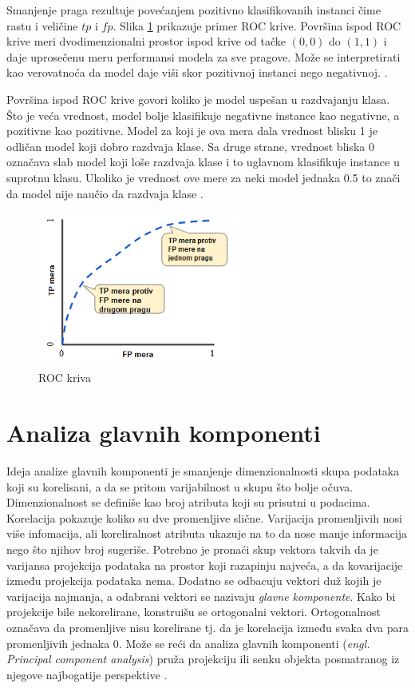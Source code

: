 Smanjenje praga rezultuje povećanjem pozitivno klasifikovanih instanci čime rastu i veličine $tp$ i $fp$. Slika \ref{fig:roc} prikazuje primer ROC krive. Površina ispod ROC krive meri dvodimenzionalni prostor ispod krive od tačke $(0, 0)$ do $(1, 1)$ i daje uprosečenu meru performansi modela za sve pragove. Može se interpretirati kao verovatnoća da model daje viši skor pozitivnoj instanci nego negativnoj. \cite{roc}. 

Površina ispod ROC krive govori koliko je model uspešan u razdvajanju klasa. Što je veća vrednost, model bolje klasifikuje negativne instance kao negativne, a pozitivne kao pozitivne. Model za koji je ova mera dala vrednost blisku 1 je odličan model koji dobro razdvaja klase. Sa druge strane, vrednost bliska 0 označava slab model koji loše razdvaja klase i to uglavnom klasifikuje instance u suprotnu klasu. Ukoliko je vrednost ove mere za neki model jednaka 0.5 to znači da model nije naučio da razdvaja klase \cite{auc}.


\begin{figure}[h]
	\centering
	\includegraphics[width=0.6\textwidth]{Figures/roc.png}
	\caption{ROC kriva \cite{roc}}
	\label{fig:roc}
\end{figure}




\section{Analiza glavnih komponenti}

Ideja analize glavnih komponenti je smanjenje dimenzionalnosti skupa podataka koji su korelisani, a da se pritom varijabilnost u skupu što bolje očuva. Dimenzionalnost se definiše kao broj atributa koji su prisutni u podacima. Korelacija pokazuje koliko su dve promenljive slične. Varijacija promenljivih nosi više infomacija, ali koreliralnost atributa ukazuje na to da nose manje informacija nego što njihov broj sugeriše. Potrebno je pronaći skup vektora takvih da je varijansa projekcija podataka na prostor koji razapinju najveća, a da kovarijacije između projekcija podataka nema. Dodatno se odbacuju vektori duž kojih je varijacija najmanja, a odabrani vektori se nazivaju \textit{glavne komponente}. Kako bi projekcije bile nekorelirane, konstruišu se ortogonalni vektori. Ortogonalnost označava da promenljive nisu korelirane tj. da je korelacija između svaka dva para promenljivih jednaka 0. Može se reći da analiza glavnih komponenti (\textit{engl. Principal component analysis}) pruža projekciju ili senku objekta posmatranog iz njegove najbogatije perspektive \cite{introDM, ni, pcaOnl}. 


